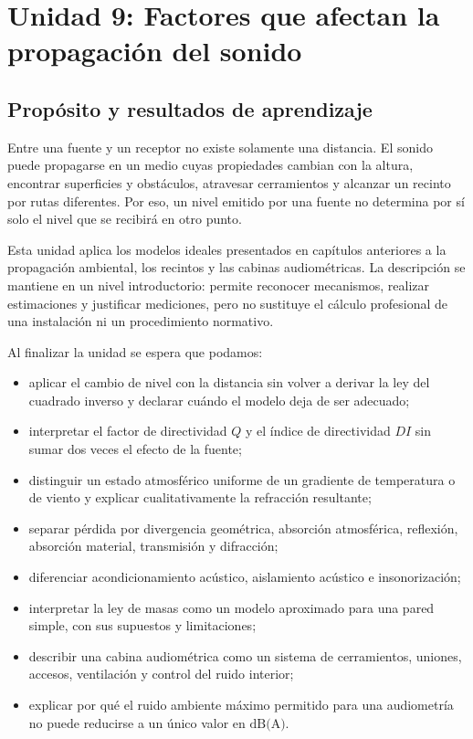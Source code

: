 \chapter{Unidad 9: Factores que afectan la propagación del sonido}
\label{chap:unidad-9}

\section{Propósito y resultados de aprendizaje}
\label{sec:u9-proposito}

Entre una fuente y un receptor no existe solamente una distancia. El sonido
puede propagarse en un medio cuyas propiedades cambian con la altura, encontrar
superficies y obstáculos, atravesar cerramientos y alcanzar un recinto por
rutas diferentes. Por eso, un nivel emitido por una fuente no determina por sí
solo el nivel que se recibirá en otro punto.

Esta unidad aplica los modelos ideales presentados en capítulos anteriores a
la propagación ambiental, los recintos y las cabinas audiométricas. La
descripción se mantiene en un nivel introductorio: permite reconocer
mecanismos, realizar estimaciones y justificar mediciones, pero no sustituye
el cálculo profesional de una instalación ni un procedimiento normativo.

Al finalizar la unidad se espera que podamos:

\begin{itemize}
    \item aplicar el cambio de nivel con la distancia sin volver a derivar la
    ley del cuadrado inverso y declarar cuándo el modelo deja de ser adecuado;
    \item interpretar el factor de directividad \(Q\) y el índice de
    directividad \(DI\) sin sumar dos veces el efecto de la fuente;
    \item distinguir un estado atmosférico uniforme de un gradiente de
    temperatura o de viento y explicar cualitativamente la refracción
    resultante;
    \item separar pérdida por divergencia geométrica, absorción atmosférica,
    reflexión, absorción material, transmisión y difracción;
    \item diferenciar acondicionamiento acústico, aislamiento acústico e
    insonorización;
    \item interpretar la ley de masas como un modelo aproximado para una pared
    simple, con sus supuestos y limitaciones;
    \item describir una cabina audiométrica como un sistema de cerramientos,
    uniones, accesos, ventilación y control del ruido interior;
    \item explicar por qué el ruido ambiente máximo permitido para una
    audiometría no puede reducirse a un único valor en \(\text{dB(A)}\).
\end{itemize}

